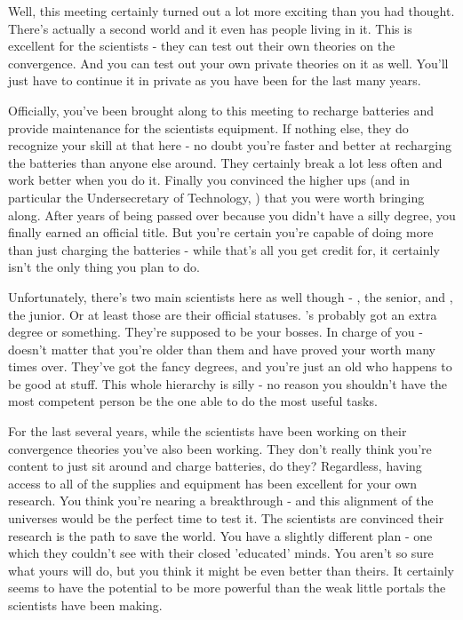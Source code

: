 \documentclass[char]{guildcamp3}
\begin{document}
\name{\cTech{}}


Well, this meeting certainly turned out a lot more exciting than you had thought. There's actually a second world and it even has people living in it. This is excellent for the scientists - they can test out their own theories on the convergence. And you can test out your own private theories on it as well. You'll just have to continue it in private as you have been for the last many years. 

Officially, you've been brought along to this meeting to recharge batteries and provide maintenance for the scientists equipment. If nothing else, they do recognize your skill at that here - no doubt you're faster and better at recharging the batteries than anyone else around. They certainly break a lot less often and work better when you do it. Finally you convinced the higher ups (and in particular the Undersecretary of Technology, \cPoliTwo{\intro}) that you were worth bringing along. After years of being passed over because you didn't have a silly degree, you finally earned an official title. But you're certain you're capable of doing more than just charging the batteries - while that's all you get credit for, it certainly isn't the only thing you plan to do. 

Unfortunately, there's two main scientists here as well though - \cSciOne{\intro}, the senior, and \cSciTwo{\intro}, the junior. Or at least those are their official statuses. \cSciOne{}'s probably got an extra degree or something. They're supposed to be your bosses. In charge of you - doesn't matter that you're older than them and have proved your worth many times over. They've got the fancy degrees, and you're just an old \cTech{\human} who happens to be good at stuff. This whole hierarchy is silly - no reason you shouldn't have the most competent person be the one able to do the most useful tasks. 

For the last several years, while the scientists have been working on their convergence theories you've also been working. They don't really think you're content to just sit around and charge batteries, do they? Regardless, having access to all of the supplies and equipment has been excellent for your own research. You think you're nearing a breakthrough - and this alignment of the universes would be the perfect time to test it. The scientists are convinced their research is the path to save the world. You have a slightly different plan - one which they couldn't see with their closed 'educated' minds. You aren't so sure what yours will do, but you think it might be even better than theirs. It certainly seems to have the potential to be more powerful than the weak little portals the scientists have been making. 
\end{document}
